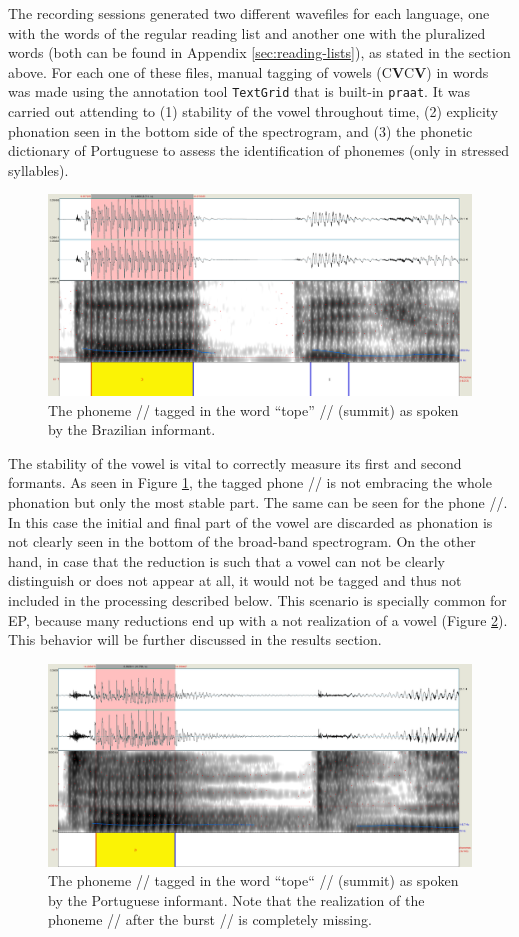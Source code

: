 \documentclass[a4paper,11pt]{article}
\begin{document}
     The recording sessions generated two different wavefiles for each language, one with the words of the regular reading list and another one with the pluralized words (both can be found in Appendix \ref{sec:reading-lists}), as stated in the section above. For each one of these files, manual tagging of vowels (C\textbf{V}C\textbf{V}) in words was made using the annotation tool \texttt{TextGrid} that is built-in \texttt{praat}. It was carried out attending to (1) stability of the vowel throughout time, (2) explicity phonation seen in the bottom side of the spectrogram, and (3) the phonetic dictionary of Portuguese \cite{dicionario} to assess the identification of phonemes (only in stressed syllables).
     
\begin{figure}[htbp]
    \centering
    \includegraphics[width=0.6\linewidth]{figs/tope-bp}
    \caption{The phoneme // tagged in the word ``tope'' // (summit) as spoken by the Brazilian informant.}
    \label{fig:tope-bp}
\end{figure}

The stability of the vowel is vital to correctly measure its first and second formants. As seen in Figure \ref{fig:tope-bp}, the tagged phone // is not embracing the whole phonation but only the most stable part. The same can be seen for the phone //. In this case the initial and final part of the vowel are discarded as phonation is not clearly seen in the bottom of the broad-band spectrogram. On the other hand, in case that the reduction is such that a vowel can not be clearly distinguish or does not appear at all, it would not be tagged and thus not included in the processing described below. This scenario is specially common for EP, because many reductions end up with a not realization of a vowel (Figure \ref{fig:tope-ep}). This behavior will be further discussed in the results section. 
\begin{figure}[htbp]
    \centering
    \includegraphics[width=0.6\linewidth]{figs/tope-ep}
    \caption{The phoneme // tagged in the word ``tope`` // (summit) as spoken by the Portuguese informant. Note that the realization of the phoneme // after the burst // is completely missing.}
    \label{fig:tope-ep}
\end{figure}
\end{document}
